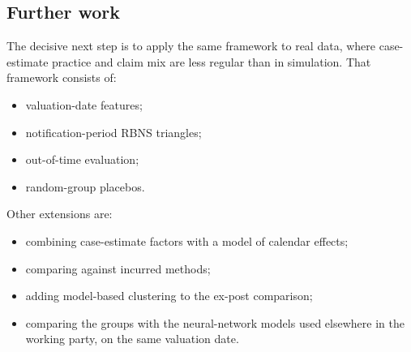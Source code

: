 \subsection{Further work}

The decisive next step is to apply the same framework to real data, where case-estimate practice and claim mix are less regular than in simulation. That framework consists of:
\begin{itemize}[leftmargin=*]
\item valuation-date features;
\item notification-period RBNS triangles;
\item out-of-time evaluation;
\item random-group placebos.
\end{itemize}

Other extensions are:
\begin{itemize}[leftmargin=*]
\item combining case-estimate factors with a model of calendar effects;
\item comparing against incurred methods;
\item adding model-based clustering to the ex-post comparison;
\item comparing the groups with the neural-network models used elsewhere in the working party, on the same valuation date.
\end{itemize}

